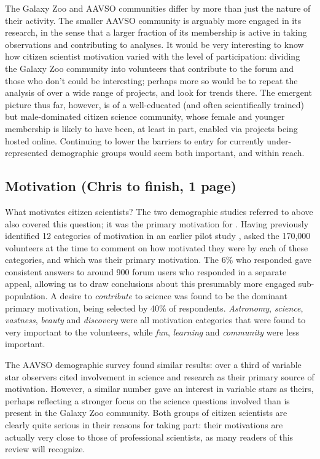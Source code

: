 \documentclass{ar2e}
\begin{document}
The Galaxy Zoo and AAVSO communities differ by more than just the nature of
their activity. The smaller AAVSO community is arguably more engaged in its
research, in the sense that a larger fraction of its membership is active in
taking observations and contributing to analyses. It would be very interesting
to know how citizen scientist motivation varied with the level of
participation: dividing the Galaxy Zoo community into volunteers that
contribute to the  forum and those who don't could be interesting; perhaps
more so would be to repeat the analysis of \citeauthor{Rad++2013} over a wide
range of projects, and look for trends there. The emergent picture thus far,
however, is of a well-educated (and often scientifically trained)  but
male-dominated citizen science community, whose female and younger membership
is likely to have been, at least in part, enabled via projects being hosted
online. Continuing to lower the barriers to entry for currently
under-represented demographic groups would seem both important, and within
reach.



\subsection{Motivation (Chris to finish, 1 page)}
\label{sec:crowd:motivation}

What motivates citizen scientists? The two demographic studies referred to
above also covered this question; it was the primary motivation for
\citeauthor{Rad++2013}. Having previously identified 12 categories of
motivation in an earlier pilot study \citep{Rad++2010}, \citeauthor{Rad++2013}
asked the 170,000 volunteers at the time to comment on how motivated they were
by each of these categories, and which was their primary motivation. The 6\%
who responded gave consistent answers to around 900 forum users who responded
in a separate appeal, allowing us to draw conclusions about this presumably
more engaged sub-population. A desire to {\it contribute} to science was found
to be the dominant primary motivation, being selected by 40\% of respondents.
{\it Astronomy}, {\it science}, {\it vastness}, {\it beauty} and 
{\it discovery} were all motivation categories that were found to very
important to the volunteers, while {\it fun}, {\it learning} and {\it
community} were less important. 

The AAVSO demographic survey \citep{P+P2012} found similar results: over a
third of variable star observers cited involvement in science and research as
their primary source of motivation. However, a similar number gave an interest
in variable stars as theirs, perhaps reflecting a stronger focus on the
science questions involved than is present in the Galaxy Zoo community. Both
groups of citizen scientists are clearly quite serious in their reasons for
taking part: their motivations are actually very close to those of
professional scientists, as many readers of this review will recognize.
\end{document}
